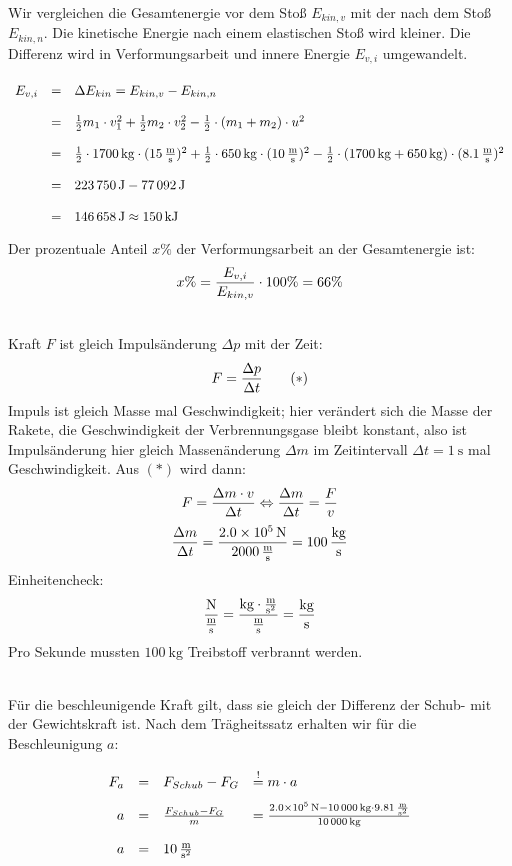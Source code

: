 \documentclass[a4paper]{article}
\begin{document}
\\
Wir vergleichen die Gesamtenergie vor dem Stoß $E_{kin,v}$ mit der nach dem Stoß $E_{kin,n}$. Die kinetische Energie  nach einem elastischen Stoß wird kleiner. Die Differenz wird in Verformungsarbeit und innere Energie $E_{v,i}$ umgewandelt.
$$
\renewcommand{\arraystretch}{2}
\begin{array}{rcl}
E_{v,i} & = & \Delta E_{kin}  = E_{kin,v} - E_{kin,n} \\
        & = & {1 \over 2}m_1 \cdot v_1^2 + {1 \over 2}m_2 \cdot v_2^2
        - {1 \over 2}\cdot (m_1+m_2) \cdot u^2  \\
        & = & {1 \over 2}\cdot \SI{1700}{\kilogram} \cdot (\SI{15}{\meter\over\second})^2 + {1 \over 2}\cdot\SI{650}{\kilogram} \cdot (\SI{10}{\meter\over\second})^2
        - {1 \over 2}\cdot (\SI{1700}{\kilogram} + \SI{650}{\kilogram}) \cdot (\SI{8,1}{\meter\over\second})^2\\
        & = & \SI{223750}{\joule} - \SI{77092}{\joule}\\
        & = & \SI{146658}{\joule} \approx \SI{150}{\kilo\joule} 
\end{array}
$$
Der prozentuale Anteil $x \%$ der Verformungsarbeit an der Gesamtenergie ist:
$$ x\% = {E_{v,i}\over E_{kin,v}}\cdot 100\%= 66\%$$
\vspace{0.5 cm}

\\
Kraft $F$ ist gleich Impulsänderung $\Delta p $ mit der Zeit:
$$F = {\Delta p  \over \Delta t} \qquad (*) $$
Impuls ist gleich Masse mal Geschwindigkeit; hier verändert sich die Masse der Rakete, die Geschwindigkeit der Verbrennungsgase bleibt konstant, also ist Impulsänderung hier gleich Massenänderung $\Delta m$ im Zeitintervall $ \Delta t = \SI{1}{\second}$ mal Geschwindigkeit. Aus $(*)$ wird dann:
$$F= {\Delta m \cdot v  \over \Delta t} \Leftrightarrow {\Delta m \over \Delta t}= {F \over v}$$
$$ {\Delta m \over \Delta t} = {\SI{2,0e5}{\newton} \over  \SI{2000}{\meter\over\second}} = \SI{100}{kg \over s}$$
Einheitencheck:
$$ {\SI{}{\newton\over{\meter\over\second}}}= \SI{}{\kilogram\cdot {\meter\over{\second^2}} \over {\meter\over\second}} = \SI{}{\kilogram\over \second}$$
Pro Sekunde mussten $\SI{100}{\kilogram}$ Treibstoff verbrannt werden. 
\vspace{0.5 cm}

\\
Für die beschleunigende Kraft gilt, dass sie gleich der Differenz der Schub- mit der Gewichtskraft ist. Nach dem Trägheitssatz erhalten wir für die Beschleunigung $a$:
$$
\renewcommand{\arraystretch}{2}
\begin{array}{rcll}
F_a &=& F_{Schub}-F_G &\stackrel{!}{=} m \cdot a\\
  a &=& {F_{Schub}-F_G \over m} & = {\SI{2,0e5}{\newton} - \SI{10000}{\kilogram}\cdot  \SI{9,81}{\meter\over{\second^2}} \over \SI{10000}{\kilogram} }\\
  a &=&  \SI{10}{\meter \over {\second^2}}
\end{array}
$$
\vspace{0.5 cm}
\end{document}
